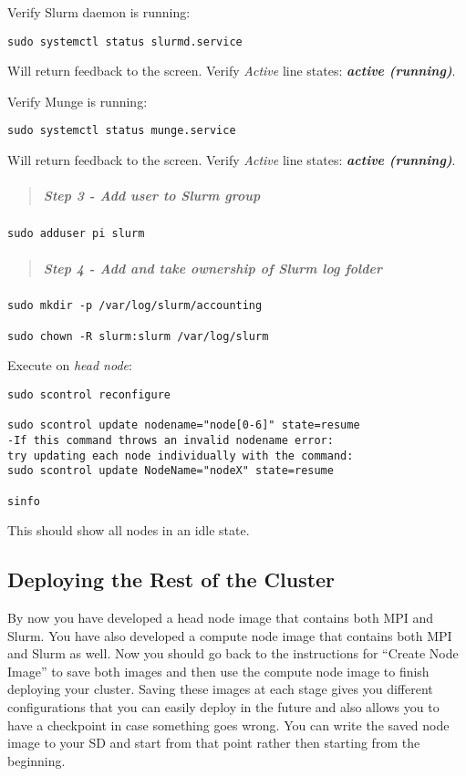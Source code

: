 \documentclass[]{article}
\let\oldsubparagraph\subparagraph
\renewcommand{\subparagraph}[1]{\oldsubparagraph{#1}\mbox{}}
\begin{document}
Verify Slurm daemon is running:

\texttt{sudo\ systemctl\ status\ slurmd.service}

Will return feedback to the screen. Verify \emph{Active} line states:
\emph{\textbf{active (running)}}.

Verify Munge is running:

\texttt{sudo\ systemctl\ status\ munge.service}

Will return feedback to the screen. Verify \emph{Active} line states:
\emph{\textbf{active (running)}}.

\begin{quote}
\mbox{}%
\subparagraph{Step 3 - Add user to Slurm
group}\label{step-3---add-user-to-slurm-group}
\end{quote}

\texttt{sudo\ adduser\ pi\ slurm}

\begin{quote}
\mbox{}%
\subparagraph{Step 4 - Add and take ownership of Slurm log
folder}\label{step-4---add-and-take-ownership-of-slurm-log-folder}
\end{quote}

\begin{verbatim}
sudo mkdir -p /var/log/slurm/accounting

sudo chown -R slurm:slurm /var/log/slurm
\end{verbatim}

Execute on \emph{head node}:

\begin{verbatim}
sudo scontrol reconfigure

sudo scontrol update nodename="node[0-6]" state=resume
-If this command throws an invalid nodename error:
try updating each node individually with the command:
sudo scontrol update NodeName="nodeX" state=resume

sinfo
\end{verbatim}

This should show all nodes in an idle state.

\subsection{Deploying the Rest of the
Cluster}\label{deploying-the-rest-of-the-cluster}

By now you have developed a head node image that contains both MPI and
Slurm. You have also developed a compute node image that contains both
MPI and Slurm as well. Now you should go back to the instructions for
``Create Node Image'' to save both images and then use the compute node
image to finish deploying your cluster. Saving these images at each
stage gives you different configurations that you can easily deploy in
the future and also allows you to have a checkpoint in case something
goes wrong. You can write the saved node image to your SD and start from
that point rather then starting from the beginning.
\end{document}
